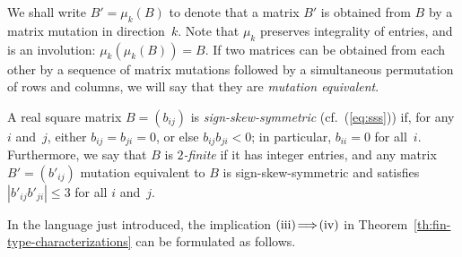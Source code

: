 \documentclass[letterpaper]{amsart}
\numberwithin{equation}{section}
\theoremstyle{definition}
\newtheorem{definition}[theorem]{Definition}
\begin{document}
We shall write $B' = \mu_k (B)$ to denote that a matrix $B'$ is 
obtained from $B$ by a matrix mutation in direction~$k$. 
Note that $\mu_k$ preserves integrality of entries, 
and is an involution: $\mu_k(\mu_k(B))=B$. 
If two matrices %
can be obtained from each other by a 
sequence of matrix mutations followed by a simultaneous permutation of 
rows and columns, we will say that they are \emph{mutation equivalent}. 
 
 
A real square matrix $B = (b_{ij})$ is 
\emph{sign-skew-symmetric} (cf.\ (\ref{eq:sss})) 
if, for any $i$ and~$j$, 
either $b_{ij} = b_{ji} = 0$, or else $b_{ij}b_{ji} < 0$; 
in particular, $b_{ii} = 0$ for all~$i$. 
Furthermore, we say that $B$ is \emph{$2$-finite} if it has integer entries, and 
any matrix $B'=(b'_{ij})$ mutation equivalent to 
$B$ is sign-skew-symmetric and satisfies $|b'_{ij} b'_{ji}| \leq 3$ for 
all $i$ and~$j$. 
 
 
 
 
In the language just introduced, 
the implication 
${\rm(iii)}\!\Longrightarrow\!{\rm(iv)}$ 
in Theorem~\ref{th:fin-type-characterizations} 
can be formulated as follows. 
 
\end{document}
